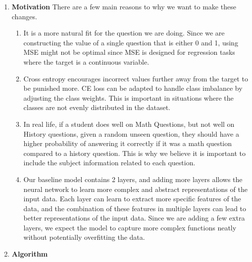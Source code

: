 \documentclass{article}
\begin{document}
\begin{enumerate}
\begin{enumerate}
     \item \textbf{Motivation }There are a few main reasons to why we want to make these changes.
     \begin{enumerate}
         \item It is a more natural fit for the question we are doing. Since we are constructing the value of a single question that is either 0 and 1, using MSE might not be optimal since MSE is designed for regression tasks where the target is a continuous variable. 
         \item Cross entropy encourages incorrect values further away from the target to be punished more. CE loss can be adapted to handle class imbalance by adjusting the class weights. This is important in situations where the classes are not evenly distributed in the dataset.
         \item In real life, if a student does well on Math Questions, but not well on History questions, given a random unseen question, they should have a higher probability of answering it correctly if it was a math question compared to a history question. This is why we believe it is important to include the subject information related to each question. 
         \item Our baseline model contains 2 layers, and adding more layers allows the neural network to learn more complex and abstract representations of the input data. Each layer can learn to extract more specific features of the data, and the combination of these features in multiple layers can lead to better representations of the input data. Since we are adding a few extra layers, we expect the model to capture more complex functions neatly without potentially overfitting the data. 
     \end{enumerate}
    \item \textbf{Algorithm}
    

\end{enumerate}
\end{enumerate}
\end{document}
